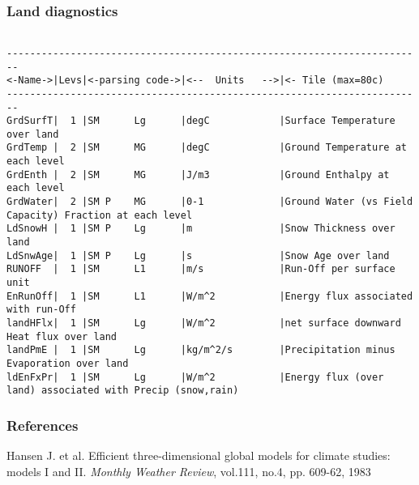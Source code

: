 \subsubsection{Land diagnostics}
\label{sec:pkg:land:diagnostics}

\begin{verbatim}

------------------------------------------------------------------------
<-Name->|Levs|<-parsing code->|<--  Units   -->|<- Tile (max=80c) 
------------------------------------------------------------------------
GrdSurfT|  1 |SM      Lg      |degC            |Surface Temperature over land
GrdTemp |  2 |SM      MG      |degC            |Ground Temperature at each level
GrdEnth |  2 |SM      MG      |J/m3            |Ground Enthalpy at each level
GrdWater|  2 |SM P    MG      |0-1             |Ground Water (vs Field Capacity) Fraction at each level
LdSnowH |  1 |SM P    Lg      |m               |Snow Thickness over land
LdSnwAge|  1 |SM P    Lg      |s               |Snow Age over land
RUNOFF  |  1 |SM      L1      |m/s             |Run-Off per surface unit
EnRunOff|  1 |SM      L1      |W/m^2           |Energy flux associated with run-Off
landHFlx|  1 |SM      Lg      |W/m^2           |net surface downward Heat flux over land
landPmE |  1 |SM      Lg      |kg/m^2/s        |Precipitation minus Evaporation over land
ldEnFxPr|  1 |SM      Lg      |W/m^2           |Energy flux (over land) associated with Precip (snow,rain)
\end{verbatim}

\subsubsection{References}

Hansen J. et al. Efficient three-dimensional global models for climate
studies: models I and II. \emph{Monthly Weather Review}, vol.111, no.4, pp.
609-62, 1983

% 
